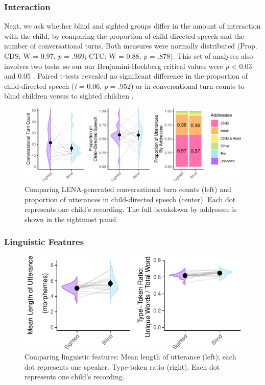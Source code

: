 \documentclass[
  man]{apa6}
\begin{document}
\hypertarget{interaction-1}{%
\subsubsection{Interaction}\label{interaction-1}}

Next, we ask whether blind and sighted groups differ in the amount of interaction with the child, by comparing the proportion of child-directed speech and the number of conversational turns. Both measures were normally distributed (Prop. CDS: W = 0.97, \emph{p} = .969; CTC: W = 0.88, \emph{p} = .878). This set of analyses also involves two tests, so our our Benjamini-Hochberg critical values were \emph{p} \textless{} 0.03 and 0.05 . Paired t-tests revealed no significant difference in the proportion of child-directed speech (\emph{t} = 0.06, \emph{p} = .952) or in conversational turn counts to blind children versus to sighted children .

\begin{figure}
\centering
\includegraphics{input_quality_manuscript_files/figure-latex/interaction-plots-1.pdf}
\caption{\label{fig:interaction-plots}Comparing LENA-generated conversational turn counts (left) and proportion of utterances in child-directed speech (center). Each dot represents one child's recording. The full breakdown by addressee is shown in the rightmost panel.}
\end{figure}

\hypertarget{linguistic-features-1}{%
\subsubsection{Linguistic Features}\label{linguistic-features-1}}

\begin{figure}
\centering
\includegraphics{input_quality_manuscript_files/figure-latex/linguistic-plots-1.pdf}
\caption{\label{fig:linguistic-plots}Comparing linguistic features: Mean length of utterance (left); each dot represents one speaker. Type-token ratio (right). Each dot represents one child's recording.}
\end{figure}
\end{document}

